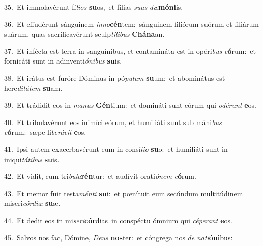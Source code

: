 {\numbfont\textcolor{\numbcolor}{35.}}~Et immolavérunt fí\-\textit{li}\-\textit{os} \textbf{su}\-os,~\star et fílias \textit{su}\-\textit{as} \textit{dæ}\-\textbf{mó}\textbf{ni}is.\par
{\numbfont\textcolor{\numbcolor}{36.}}~Et effudérunt sánguinem \textit{in}\-\textit{no}\textbf{cén}tem:~\star sánguinem filiórum suórum et filiárum suárum, quas sacrificavérunt sculp\-\textit{tí}\-\textit{li}\textit{bus} \textbf{Chá}\-\textbf{na}an.\par
{\numbfont\textcolor{\numbcolor}{37.}}~Et infécta est terra in sanguínibus, et contamináta est in opéri\textit{bus} \textit{e}\-\textbf{ó}rum:~\star et fornicáti sunt in adinventi\-\textit{ó}\-\textit{ni}\textit{bus} \textbf{su}\-is.\par
{\numbfont\textcolor{\numbcolor}{38.}}~Et irátus est furóre Dóminus in pó\-\textit{pu}\-\textit{lum} \textbf{su}\-um:~\star et abominátus est here\-\textit{di}\-\textit{tá}\textit{tem} \textbf{su}\-am.\par
{\numbfont\textcolor{\numbcolor}{39.}}~Et trádidit eos in \textit{ma}\-\textit{nus} \textbf{Gén}\-tium:~\star et domináti sunt eórum qui \textit{o}\-\textit{dé}\textit{runt} \textbf{e}\-os.\par
{\numbfont\textcolor{\numbcolor}{40.}}~Et tribulavérunt eos inimíci eórum, et humiliáti sunt sub máni\textit{bus} \textit{e}\-\textbf{ó}rum:~\star sæpe li\-\textit{be}\-\textit{rá}\textit{vit} \textbf{e}\-os.\par
{\numbfont\textcolor{\numbcolor}{41.}}~Ipsi autem exacerbavérunt eum in consí\-\textit{li}\-\textit{o} \textbf{su}\-o:~\star et humiliáti sunt in iniqui\-\textit{tá}\-\textit{ti}\textit{bus} \textbf{su}\-is.\par
{\numbfont\textcolor{\numbcolor}{42.}}~Et vidit, cum tri\-\textit{bu}\-\textit{la}\textbf{rén}tur:~\star et audívit orati\-\textit{ó}\-\textit{nem} \textit{e}\-\textbf{ó}rum.\par
{\numbfont\textcolor{\numbcolor}{43.}}~Et memor fuit testa\-\textit{mén}\-\textit{ti} \textbf{su}\-i:~\star et pœnítuit eum secúndum multitúdinem miseri\-\textit{cór}\-\textit{di}\textit{æ} \textbf{su}\-æ.\par
{\numbfont\textcolor{\numbcolor}{44.}}~Et dedit eos in mi\-\textit{se}\-\textit{ri}\textbf{cór}dias~\star in conspéctu ómnium qui \textit{cé}\-\textit{pe}\textit{rant} \textbf{e}\-os.\par
{\numbfont\textcolor{\numbcolor}{45.}}~Salvos nos fac, Dómine, \textit{De}\-\textit{us} \textbf{nos}\-ter:~\star et cóngrega nos \textit{de} \textit{na}\-\textit{ti}\textbf{ó}\textbf{ni}bus:\par
